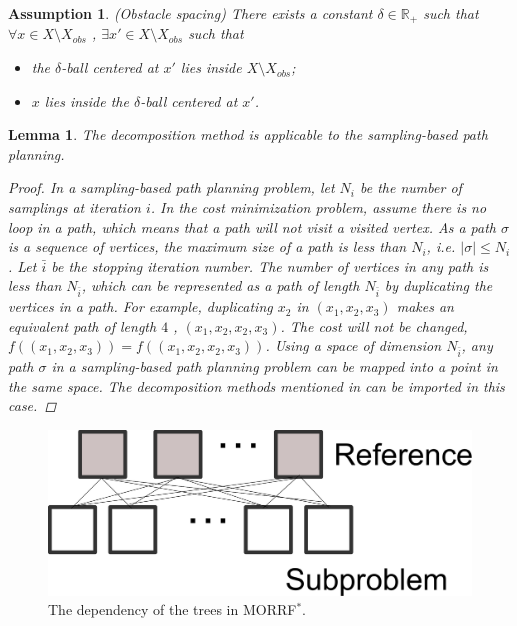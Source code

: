 \documentclass[conference]{IEEEtran}
\newtheorem{lem}{Lemma}
\newtheorem{asmp}{Assumption}
\theoremstyle{definition}
\begin{document}
\begin{asmp}{(Obstacle spacing)}
There exists a constant $ \delta \in \mathbb{R}_{+} $ such that $ \forall x \in X \setminus X_{obs} $ , $ \exists x' \in X \setminus X_{obs} $ such that
\begin{itemize}
\item the $ \delta $-ball centered at $ x' $ lies inside $ X \setminus X_{obs} $;
\item $ x $ lies inside the $ \delta $-ball centered at $ x' $.
\end{itemize}
\end{asmp}

\begin{lem}
\label{lem:moo-d:rrt}
The decomposition method is applicable to the sampling-based path planning.
\begin{proof}
In a sampling-based path planning problem, let $ N_{i} $ be the number of samplings at iteration $ i $.
In the cost minimization problem, assume there is no loop in a path, which means that a path will not visit a visited vertex.
As a path $ \sigma $ is a sequence of vertices, the maximum size of a path is less than $ N_{i} $, i.e.
$ | \sigma | \leq N_{i} $.
Let $ \bar{i} $ be the stopping iteration number.
The number of vertices in any path is less than $ N_{ \bar{i} } $, which can be represented as a path of length $ N_{ \bar{i} } $ by duplicating the vertices in a path.
For example, duplicating $ x_{2} $ in $ (x_{1} , x_{2}, x_{3} ) $ makes an equivalent path of length $ 4 $ , $ (x_{1} , x_{2},  x_{2}, x_{3} ) $.
The cost will not be changed, $ f( (x_{1} , x_{2}, x_{3}) ) = f( (x_{1} , x_{2},  x_{2}, x_{3} ) )$.
Using a space of dimension $ N_{ \bar{i} } $, any path $ \sigma $ in a sampling-based path planning problem can be mapped into a point in the same space.
The decomposition methods mentioned in \cite{4358754} can be imported in this case.		
\end{proof}
\end{lem}

\begin{figure}
\centering
\includegraphics[width=0.7\linewidth]{fig/dependency}
\caption{The dependency of the trees in MORRF$^{*}$.}
\label{fig:dependency}
\end{figure}
\end{document}
